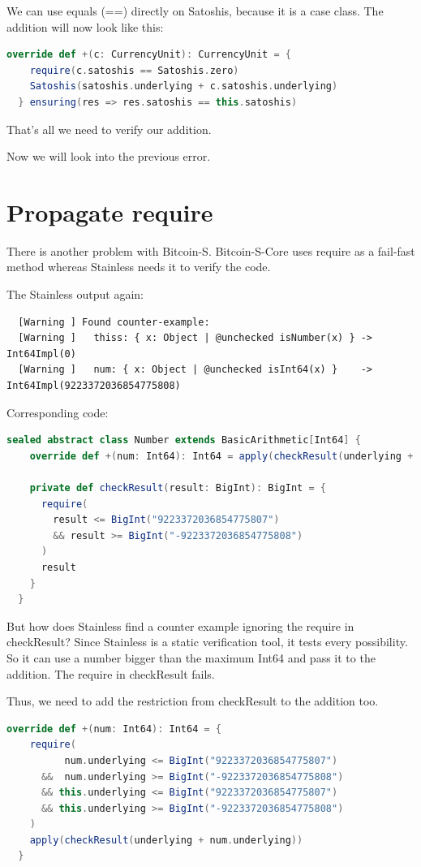 We can use equals (==) directly on Satoshis, because it is a case class.
The addition will now look like this:
\begin{lstlisting}[language=scala]
  override def +(c: CurrencyUnit): CurrencyUnit = {
    require(c.satoshis == Satoshis.zero)
    Satoshis(satoshis.underlying + c.satoshis.underlying)
  } ensuring(res => res.satoshis == this.satoshis)
\end{lstlisting}

That's all we need to verify our addition.

Now we will look into the previous error.


\section{Propagate require}

There is another problem with Bitcoin-S.
Bitcoin-S-Core uses require as a fail-fast method whereas Stainless needs it to verify the code.

The Stainless output again:
{\footnotesize\begin{verbatim}
  [Warning ] Found counter-example:
  [Warning ]   thiss: { x: Object | @unchecked isNumber(x) } -> Int64Impl(0)
  [Warning ]   num: { x: Object | @unchecked isInt64(x) }    -> Int64Impl(9223372036854775808)
\end{verbatim}}

Corresponding code:
\begin{lstlisting}[language=scala]
  sealed abstract class Number extends BasicArithmetic[Int64] {
    override def +(num: Int64): Int64 = apply(checkResult(underlying + num.underlying))

    private def checkResult(result: BigInt): BigInt = {
      require(
        result <= BigInt("9223372036854775807")
        && result >= BigInt("-9223372036854775808")
      )
      result
    }
  }
\end{lstlisting}

But how does Stainless find a counter example ignoring the require in checkResult?
Since Stainless is a static verification tool, it tests every possibility.
So it can use a number bigger than the maximum Int64 and pass it to the addition.
The require in checkResult fails.

Thus, we need to add the restriction from checkResult to the addition too.
\begin{lstlisting}[language=scala]
  override def +(num: Int64): Int64 = {
    require(
          num.underlying <= BigInt("9223372036854775807")
      &&  num.underlying >= BigInt("-9223372036854775808")
      && this.underlying <= BigInt("9223372036854775807")
      && this.underlying >= BigInt("-9223372036854775808")
    )
    apply(checkResult(underlying + num.underlying))
  }
\end{lstlisting}

